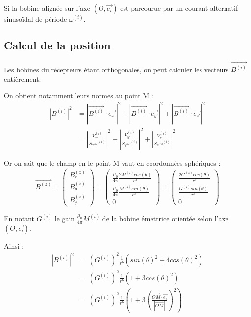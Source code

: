 \documentclass[a4paper,11pt]{article}
\begin{document}
Si la bobine alignée sur l'axe $(O,\vec{e_i})$ est parcourue par un courant alternatif sinusoïdal de période $\omega^{(i)}$.

\subsection{Calcul de la position}

Les bobines du récepteurs étant orthogonales, on peut calculer les vecteurs $\vec{B^{(i)}}$ entièrement.

On obtient notamment leurs normes au point M : 
\begin{align}
  \left|B^{(i)}\right|^2 &= \left| \vec{B^{(i)}}\cdot \vec{e_{x'}}\right|^2 + 
                           \left| \vec{B^{(i)}}\cdot \vec{e_{y'}}\right|^2 + 
                           \left| \vec{B^{(i)}}\cdot \vec{e_{z'}}\right|^2\\
                        &= \left| \frac{V^{(i)}_{x'}}{S_{x'}\omega^{(i)}}\right|^2 + 
                           \left| \frac{V^{(i)}_{y'}}{S_{y'}\omega^{(i)}}\right|^2 + 
                           \left| \frac{V^{(i)}_{z'}}{S_{z'}\omega^{(i)}}\right|^2
\end{align}

Or on sait que le champ en le point M vaut en coordonnées sphériques :
\[
\vec{B^{(z)}}
=
\left(
  \begin{array}{ c }
    B^{(z)}_{r} \\
    B^{(z)}_{\theta} \\
    B^{(z)}_{\phi}
  \end{array} \right)
=
\left(
  \begin{array}{ c }
    \frac{\mu_0}{4\pi}\frac{2M^{(z)} cos(\theta)}{r^3} \\
    \frac{\mu_0}{4\pi}\frac{M^{(z)} sin(\theta)}{r^3} \\
    0
  \end{array} \right)
=
\left(
  \begin{array}{ c }
    \frac{2G^{(z)} cos(\theta)}{r^3} \\
    \frac{G^{(z)} sin(\theta)}{r^3} \\
    0
  \end{array} \right)
\]

En notant $G^{(i)}$ le gain $\frac{\mu_0}{4\pi}M^{(i)}$ de la bobine émettrice orientée selon l'axe $(O,\vec{e_i})$.

Ainsi :
\begin{align}
\left|B^{(i)}\right|^2 &= \left(G^{(i)}\right)^2\frac{1}{r^6}\left(sin(\theta)^2 + 4 cos(\theta)^2\right) \\
&= \left(G^{(i)}\right)^2\frac{1}{r^6}\left(1 + 3 cos(\theta)^2\right) \\
&= \left(G^{(i)}\right)^2\frac{1}{r^6}\left(1 + 3 \left(\frac{\vec{OM}\cdot\vec{e_i}}{|\vec{OM}|}\right)^2\right)
\end{align}
\end{document}
